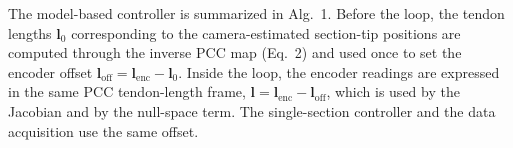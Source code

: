 The model-based controller is summarized in Alg.~1. Before the loop, the tendon lengths $\mathbf{l}_0$ corresponding to the camera-estimated section-tip positions are computed through the inverse PCC map (Eq.~2) and used once to set the encoder offset $\mathbf{l}_{\mathrm{off}} = \mathbf{l}_{\mathrm{enc}} - \mathbf{l}_0$. Inside the loop, the encoder readings are expressed in the same PCC tendon-length frame, $\mathbf{l} = \mathbf{l}_{\mathrm{enc}} - \mathbf{l}_{\mathrm{off}}$, which is used by the Jacobian and by the null-space term. The single-section controller and the data acquisition use the same offset.
